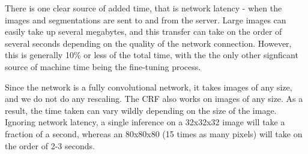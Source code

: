 There is one clear source of added time, that is network latency - when the images and segmentations are sent to and from the server. Large images can easily take up several megabytes, and this transfer can take on the order of several seconds depending on the quality of the network connection. However, this is generally 10\% or less of the total time, with the the only other signficant source of machine time being the fine-tuning process.

Since the network is a fully convolutional network, it takes images of any size, and we do not do any rescaling. The CRF also works on images of any size. As a result, the time taken can vary wildly depending on the size of the image. Ignoring network latency, a single inference on a 32x32x32 image will take a fraction of a second, whereas an 80x80x80 (15 times as many pixels) will take on the order of 2-3 seconds. 


